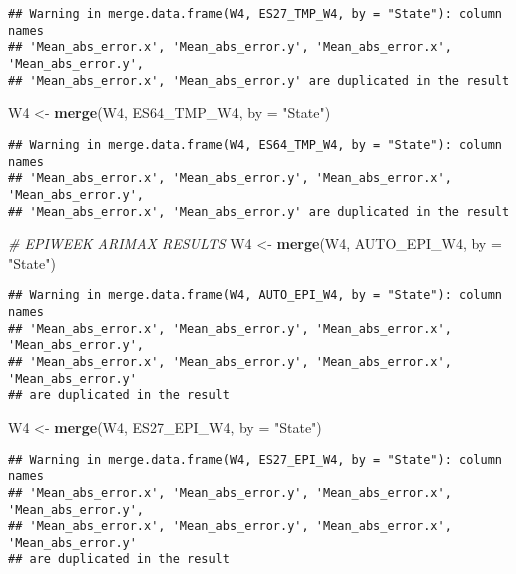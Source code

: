 \documentclass[
]{article}
\newenvironment{Shaded}{\begin{snugshade}}{\end{snugshade}}
\newcommand{\AttributeTok}[1]{\textcolor[rgb]{0.13,0.29,0.53}{#1}}
\newcommand{\CommentTok}[1]{\textcolor[rgb]{0.56,0.35,0.01}{\textit{#1}}}
\newcommand{\FunctionTok}[1]{\textcolor[rgb]{0.13,0.29,0.53}{\textbf{#1}}}
\newcommand{\NormalTok}[1]{#1}
\newcommand{\OtherTok}[1]{\textcolor[rgb]{0.56,0.35,0.01}{#1}}
\newcommand{\StringTok}[1]{\textcolor[rgb]{0.31,0.60,0.02}{#1}}
\begin{document}
\begin{verbatim}
## Warning in merge.data.frame(W4, ES27_TMP_W4, by = "State"): column names
## 'Mean_abs_error.x', 'Mean_abs_error.y', 'Mean_abs_error.x', 'Mean_abs_error.y',
## 'Mean_abs_error.x', 'Mean_abs_error.y' are duplicated in the result
\end{verbatim}

\begin{Shaded}
\begin{Highlighting}[]
\NormalTok{W4 }\OtherTok{\textless{}{-}} \FunctionTok{merge}\NormalTok{(W4, ES64\_TMP\_W4, }\AttributeTok{by =} \StringTok{"State"}\NormalTok{)}
\end{Highlighting}
\end{Shaded}

\begin{verbatim}
## Warning in merge.data.frame(W4, ES64_TMP_W4, by = "State"): column names
## 'Mean_abs_error.x', 'Mean_abs_error.y', 'Mean_abs_error.x', 'Mean_abs_error.y',
## 'Mean_abs_error.x', 'Mean_abs_error.y' are duplicated in the result
\end{verbatim}

\begin{Shaded}
\begin{Highlighting}[]
\CommentTok{\# EPIWEEK ARIMAX RESULTS}
\NormalTok{W4 }\OtherTok{\textless{}{-}} \FunctionTok{merge}\NormalTok{(W4, AUTO\_EPI\_W4, }\AttributeTok{by =} \StringTok{"State"}\NormalTok{)}
\end{Highlighting}
\end{Shaded}

\begin{verbatim}
## Warning in merge.data.frame(W4, AUTO_EPI_W4, by = "State"): column names
## 'Mean_abs_error.x', 'Mean_abs_error.y', 'Mean_abs_error.x', 'Mean_abs_error.y',
## 'Mean_abs_error.x', 'Mean_abs_error.y', 'Mean_abs_error.x', 'Mean_abs_error.y'
## are duplicated in the result
\end{verbatim}

\begin{Shaded}
\begin{Highlighting}[]
\NormalTok{W4 }\OtherTok{\textless{}{-}} \FunctionTok{merge}\NormalTok{(W4, ES27\_EPI\_W4, }\AttributeTok{by =} \StringTok{"State"}\NormalTok{)}
\end{Highlighting}
\end{Shaded}

\begin{verbatim}
## Warning in merge.data.frame(W4, ES27_EPI_W4, by = "State"): column names
## 'Mean_abs_error.x', 'Mean_abs_error.y', 'Mean_abs_error.x', 'Mean_abs_error.y',
## 'Mean_abs_error.x', 'Mean_abs_error.y', 'Mean_abs_error.x', 'Mean_abs_error.y'
## are duplicated in the result
\end{verbatim}
\end{document}
